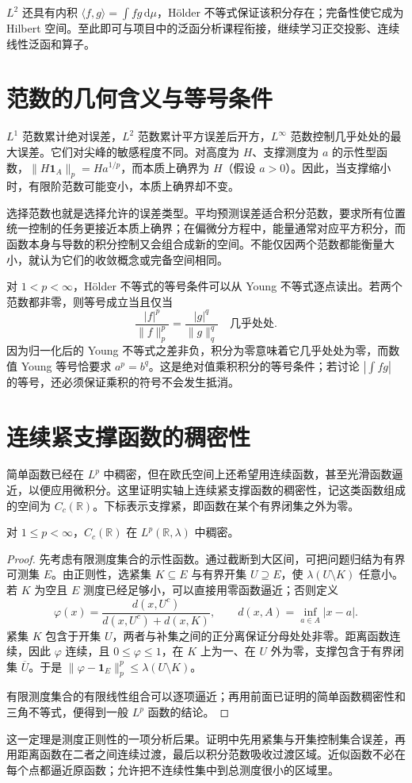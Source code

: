 \documentclass[UTF8,12pt,a4paper,fontset=fandol]{ctexbook}
\begin{document}
$L^2$ 还具有内积 $\langle f,g\rangle=\int fg\,\mathrm d\mu$，Hölder 不等式保证该积分存在；完备性使它成为 Hilbert 空间。至此即可与项目中的泛函分析课程衔接，继续学习正交投影、连续线性泛函和算子。

\section{范数的几何含义与等号条件}
$L^1$ 范数累计绝对误差，$L^2$ 范数累计平方误差后开方，$L^\infty$ 范数控制几乎处处的最大误差。它们对尖峰的敏感程度不同。对高度为 $H$、支撑测度为 $a$ 的示性型函数，$\|H\mathbf1_A\|_p=H a^{1/p}$，而本质上确界为 $H$（假设 $a>0$）。因此，当支撑缩小时，有限阶范数可能变小，本质上确界却不变。

选择范数也就是选择允许的误差类型。平均预测误差适合积分范数，要求所有位置统一控制的任务更接近本质上确界；在偏微分方程中，能量通常对应平方积分，而函数本身与导数的积分控制又会组合成新的空间。不能仅因两个范数都能衡量大小，就认为它们的收敛概念或完备空间相同。

对 $1<p<\infty$，Hölder 不等式的等号条件可以从 Young 不等式逐点读出。若两个范数都非零，则等号成立当且仅当
\[
 \frac{|f|^p}{\|f\|_p^p}=\frac{|g|^q}{\|g\|_q^q}
 \quad\text{几乎处处}.
\]
因为归一化后的 Young 不等式之差非负，积分为零意味着它几乎处处为零，而数值 Young 等号恰要求 $a^p=b^q$。这是绝对值乘积积分的等号条件；若讨论 $|\int fg|$ 的等号，还必须保证乘积的符号不会发生抵消。

\section{连续紧支撑函数的稠密性}
\label{sec:mt-continuous-density}
简单函数已经在 $L^p$ 中稠密，但在欧氏空间上还希望用连续函数，甚至光滑函数逼近，以便应用微积分。这里证明实轴上连续紧支撑函数的稠密性，记这类函数组成的空间为 $C_c(\mathbb R)$。下标表示支撑紧，即函数在某个有界闭集之外为零。

\begin{theorem}
对 $1\leq p<\infty$，$C_c(\mathbb R)$ 在 $L^p(\mathbb R,\lambda)$ 中稠密。
\label{thm:mt-cc-density}
\end{theorem}
\begin{proof}
先考虑有限测度集合的示性函数。通过截断到大区间，可把问题归结为有界可测集 $E$。由正则性，选紧集 $K\subseteq E$ 与有界开集 $U\supseteq E$，使 $\lambda(U\setminus K)$ 任意小。若 $K$ 为空且 $E$ 测度已经足够小，可以直接用零函数逼近；否则定义
\[
 \varphi(x)=\frac{d(x,U^c)}{d(x,U^c)+d(x,K)},\qquad
 d(x,A)=\inf_{a\in A}|x-a|.
\]
紧集 $K$ 包含于开集 $U$，两者与补集之间的正分离保证分母处处非零。距离函数连续，因此 $\varphi$ 连续，且 $0\leq\varphi\leq1$，在 $K$ 上为一、在 $U$ 外为零，支撑包含于有界闭集 $\overline U$。于是
$\|\varphi-\mathbf1_E\|_p^p\leq\lambda(U\setminus K)$。

有限测度集合的有限线性组合可以逐项逼近；再用前面已证明的简单函数稠密性和三角不等式，便得到一般 $L^p$ 函数的结论。
\end{proof}
这一定理是测度正则性的一项分析后果。证明中先用紧集与开集控制集合误差，再用距离函数在二者之间连续过渡，最后以积分范数吸收过渡区域。近似函数不必在每个点都逼近原函数；允许把不连续性集中到总测度很小的区域里。
\end{document}
